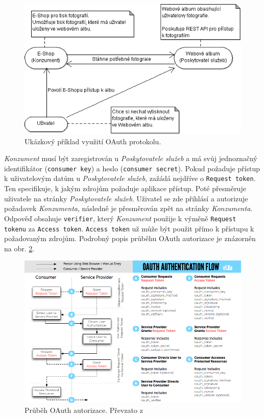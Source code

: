 \documentclass[thesis=M,czech]{FITthesis}[2014/05/6]
\begin{document}
\begin{figure}\centering
 	\includegraphics[width=1\textwidth]{images/diagram/auth_oauth_example}
 	\caption[Ukázkový příklad využití OAuth protokolu]{Ukázkový příklad využití OAuth protokolu.}\label{fig:auth_oauth_example}
\end{figure}

\textit{Konzument} musí být zaregistrován u \textit{Poskytovatele služeb} a má svůj jednoznačný identifikátor (\texttt{consumer key}) a heslo (\texttt{consumer secret}).
Pokud požaduje přístup k uživatelovým datům u \textit{Poskytovatele služeb}, zažádá nejdříve o \texttt{Request token}. Ten specifikuje, k jakým zdrojům požaduje aplikace
přístup. Poté přesměruje uživatele na stránky \textit{Poskytovatele služeb}. Uživatel se zde přihlásí a autorizuje požadavek \textit{Konzumenta}, následně je přesměrován 
zpět na stránky \textit{Konzumenta}. Odpověď obsahuje \texttt{verifier}, který \textit{Konzument} použije k výměně \texttt{Request tokenu} za \texttt{Access token}. \texttt{Access token}
už může být použit přímo k přístupu k požadovaným zdrojům. Podrobný popis průběhu OAuth autorizace je znázorněn na obr. \ref{fig:auth-oauth1}.

\begin{figure}\centering
 	\includegraphics[width=1\textwidth]{images/diagram/auth_oauth1}
 	\caption[Průběh OAuth autorizace]{Průběh OAuth autorizace. Převzato z \cite{oauth:v1}}\label{fig:auth-oauth1}
\end{figure}
\end{document}
